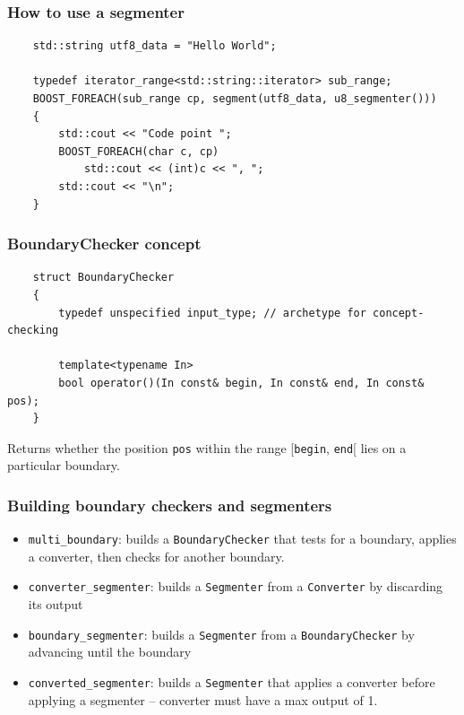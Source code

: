 \documentclass{beamer}
\begin{document}
\begin{frame}[fragile]
	\frametitle{How to use a segmenter}
	
	\begin{lstlisting}
	std::string utf8_data = "Hello World";
	
	typedef iterator_range<std::string::iterator> sub_range;
	BOOST_FOREACH(sub_range cp, segment(utf8_data, u8_segmenter()))
	{
	    std::cout << "Code point "; 
	    BOOST_FOREACH(char c, cp)
	        std::cout << (int)c << ", ";
	    std::cout << "\n";
	} 
	\end{lstlisting}
\end{frame}

\begin{frame}[fragile]
	\frametitle{BoundaryChecker concept}
	
	\begin{lstlisting}
	struct BoundaryChecker
	{
	    typedef unspecified input_type; // archetype for concept-checking
	
	    template<typename In>
	    bool operator()(In const& begin, In const& end, In const& pos);
	}
	\end{lstlisting}
	
	Returns whether the position \lstinline{pos} within the range [\lstinline{begin}, \lstinline{end}[ lies
	on a particular boundary.
	
\end{frame}

\begin{frame}
	\frametitle{Building boundary checkers and segmenters}
	
	\begin{itemize}
		\item \lstinline{multi_boundary}: builds a \lstinline{BoundaryChecker} that tests for a boundary, applies a converter, then checks for another boundary.
		\item \lstinline{converter_segmenter}: builds a \lstinline{Segmenter} from a \lstinline{Converter} by discarding its output
		\item \lstinline{boundary_segmenter}: builds a \lstinline{Segmenter} from a \lstinline{BoundaryChecker} by advancing until the boundary
		\item \lstinline{converted_segmenter}: builds a \lstinline{Segmenter} that applies a converter before applying a segmenter -- converter must have a max output of 1.
	\end{itemize}
	
\end{frame}
\end{document}
